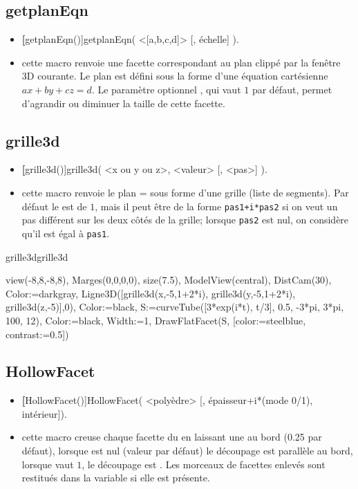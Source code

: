 \subsection{getplanEqn}
\begin{itemize}
 \item \util \textbf[getplanEqn()]{getplanEqn( <[a,b,c,d]> [, échelle] )}.
 \item \desc cette macro renvoie une facette correspondant au plan \argu{[a,b,c,d]} clippé par la fenêtre 3D courante. Le plan est défini sous la forme d'une équation cartésienne $ax+by+cz=d$. Le paramètre optionnel , qui vaut $1$ par défaut, permet d'agrandir ou diminuer la taille de cette facette.
\end{itemize}

\subsection{grille3d}
\begin{itemize}
 \item \util \textbf[grille3d()]{grille3d( <x ou y ou z>, <valeur> [, <pas>] )}.
 \item \desc cette macro renvoie le plan  =  sous forme d'une grille (liste de segments). Par défaut le  est de $1$, mais il peut être de la forme \texttt{pas1+i*pas2} si on veut un pas différent sur les deux côtés de la grille; lorsque \texttt{pas2} est nul, on considère qu'il est égal à \texttt{pas1}.
\end{itemize}

\begin{demo}{grille3d}{grille3d}
\begin{texgraph}[name=grille3d]
view(-8,8,-8,8), Marges(0,0,0,0), size(7.5),
ModelView(central), DistCam(30),
Color:=darkgray,
Ligne3D([grille3d(x,-5,1+2*i), grille3d(y,-5,1+2*i),
     grille3d(z,-5)],0),
Color:=black,
S:=curveTube([3*exp(i*t), t/3], 0.5,
       -3*pi, 3*pi, 100, 12),
Color:=black, Width:=1,
DrawFlatFacet(S,
     [color:=steelblue, contrast:=0.5])
\end{texgraph}
\end{demo}

\subsection{HollowFacet}
\begin{itemize}
 \item \util \textbf[HollowFacet()]{HollowFacet( <polyèdre> [, épaisseur+i*(mode 0/1), intérieur])}.
 \item \desc cette macro creuse chaque facette du  en laissant une  au bord (0.25 par défaut), lorsque  est nul (valeur par défaut) le découpage est parallèle au bord, lorsque  vaut $1$, le découpage est . Les morceaux de facettes enlevés sont restitués dans la variable  si elle est présente.
\end{itemize}

